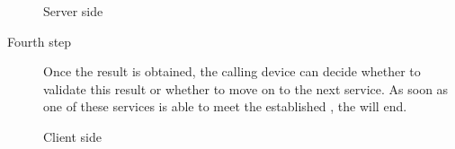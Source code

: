 \documentclass[a4paper,10pt,english,openany,oneside]{sphinxmanual}
\begin{document}
\begin{description}
\begin{description}
\item[{Server side}] \leavevmode
\begin{sphinxVerbatim}[commandchars=\\\{\}]
\PYG{p}{[}\PYG{p}{]}
\end{sphinxVerbatim}

\end{description}

\item[{Fourth step}] \leavevmode
Once the result is obtained, the calling device can decide
whether to validate this result 
or whether to move on to the next service. As soon as one of these
services is able to meet the established , the
 will end.
\begin{description}
\item[{Client side}] \leavevmode
\begin{sphinxVerbatim}[commandchars=\\\{\}]
     
      
\end{sphinxVerbatim}

\end{description}

\end{description}
\end{document}
